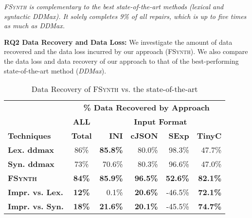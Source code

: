 \documentclass[sigconf,review,anonymous]{acmart}
\newenvironment{result}{\begin{framed}\centering\it}{\end{framed}}
\newcounter{todocounter}
\newcommand{\todo}[1]{\marginpar{$|$}\textcolor{red}{\stepcounter{todocounter}\footnote[\thetodocounter]{\textcolor{red}{\textbf{TODO }}\textit{#1}}}}
\renewcommand{\todo}[1]{}
\newcommand{\approach}{\textsc{FSynth}\xspace}
\newcommand{\ddmax}{\textit{DDMax}\xspace}
\begin{document}
\begin{result}
\approach %
is complementary to the best state-of-the-art methods (lexical and syntactic \ddmax). 
It %
solely completes 9\% of all repairs, which is 
up to five times 
as much as \ddmax.
\end{result}

\noindent
\textbf{RQ2 Data Recovery and Data Loss:} 
We investigate the amount of data recovered and the data loss incurred by our approach (\approach). 
We also compare the data loss and data recovery of our approach to that of the best-performing state-of-the-art method (\ddmax). 


\begin{table}[!tbp]\centering
\caption{Data Recovery of \approach vs. the state-of-the-art}
\begin{tabular}{|l | c | r  r  r  r |}
\hline
&  \multicolumn{5}{c|}{\textbf{\% Data Recovered by Approach}}  \\
&  \multicolumn{1}{c|}{\textbf{ALL}} & \multicolumn{4}{c|}{\textbf{Input Format}}  \\
\textbf{Techniques} & \textbf{Total} & \textbf{INI} & \textbf{cJSON} & \textbf{SExp} & \textbf{TinyC} \\
\hline
\textbf{Lex. ddmax} & 86\% & \textbf{85.8\%} & 80.0\%	 & 98.3\%	& 47.7\% \\			
\textbf{Syn. ddmax} & 73\% & 70.6\% & 80.3\%  & 96.6\%	& 47.0\% \\	
\hline
\textbf{\approach} & \textbf{ 84\%} & \textbf{85.9\%} & \textbf{96.5\%} & \textbf{52.6\%}	& \textbf{82.1\%} \\
\hline
\textbf{Impr. vs. Lex.} & \textbf{12\%} & 0.1\%	& \textbf{20.6\%}	& -46.5\%	& \textbf{72.1\%} \\
\textbf{Impr. vs. Syn.} & \textbf{18\%} & \textbf{21.6\%} 	& \textbf{20.1\%}	& -45.5\%	& \textbf{74.7\% }\\
\hline
\end{tabular}
\label{tab:data-recovery}
\end{table}
\end{document}
